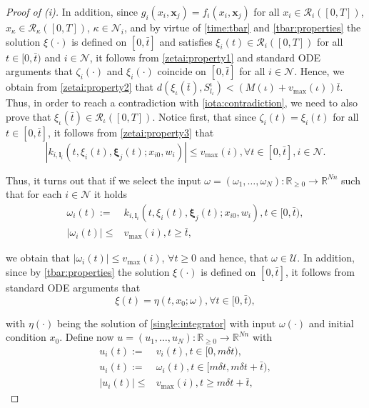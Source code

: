 \documentclass[reqno]{amsart}
\theoremstyle{plain}
\theoremstyle{definition}
\numberwithin{equation}{section}
\begin{document}
\begin{proof}[Proof of (i)]
\noindent In addition, since $g_i(x_i,{\textbf{{x}}}_j)=f_i(x_i,{\textbf{{x}}}_j)$ for all $x_i\in{\ensuremath{\mathcal{R}}}_i([0,T])$, $x_{\kappa}\in{\ensuremath{\mathcal{R}}}_{\kappa}([0,T])$, $\kappa\in{\ensuremath{\mathcal{N}}}_i$, and by virtue of \eqref{time:tbar} and \eqref{tbar:properties} the solution $\xi(\cdot)$ is defined on $[0,\bar{t}]$ and satisfies $\xi_i(t)\in{\ensuremath{\mathcal{R}}}_i([0,T])$ for all $t\in[0,\bar{t})$ and $i\in{\ensuremath{\mathcal{N}}}$, it follows from \eqref{zetai:property1} and standard ODE arguments that $\zeta_i(\cdot)$ and $\xi_i(\cdot)$ coincide on $[0,\bar{t}]$ for all $i\in{\ensuremath{\mathcal{N}}}$. Hence, we obtain from \eqref{zetai:property2} that $ d(\xi_{\iota}(\bar{t}),S_{l_{\iota}}^{\iota}) < (M(\iota)+v_{\max}(\iota))\bar{t}$. Thus, in order to reach a contradiction with \eqref{iota:contradiction}, we need to also prove that $\xi_{\iota}(\bar{t})\in{\ensuremath{\mathcal{R}}}_{\iota}([0,T])$. Notice first, that since $\zeta_i(t)=\xi_i(t)$ for all $t\in[0,\bar{t}]$, it follows from \eqref{zetai:property3} that 
\begin{equation} \label{control:laws:along:solutions}
|k_{i,{\textbf{{l}}}_i}(t,\xi_{i}(t),{\ensuremath{\boldsymbol{{\xi}}}}_j(t);x_{i0},w_i)|\le v_{\max}(i), \forall t\in[0,\bar t], i\in{\ensuremath{\mathcal{N}}}.
\end{equation}
 
\noindent Thus, it turns out that if we select the input $\omega=(\omega_1,\ldots,\omega_N):{\ensuremath{\mathbb{R}_{ \geq 0}}}\to{\ensuremath{\mathbb{R}^{{Nn}}}}$ such that for each $i\in{\ensuremath{\mathcal{N}}}$ it holds 
\begin{align*}
\omega_i(t):= & k_{i,{\textbf{{l}}}_i}(t,\xi_{i}(t),{\ensuremath{\boldsymbol{{\xi}}}}_j(t);x_{i0},w_i), t\in[0,\bar{t}), \\
|\omega_i(t)|\le & v_{\max}(i), t\ge\bar{t},
\end{align*} 

\noindent we obtain that $|\omega_i(t)|\le v_{\max}(i)$, $\forall t\ge 0$ and hence, that $\omega\in{\ensuremath{\mathcal{U}}}$. In addition, since by \eqref{tbar:properties} the solution $\xi(\cdot)$ is defined on $[0,\bar{t}]$, it follows from standard ODE arguments that 
\begin{equation} \label{xi:eq:eta}
\xi(t)=\eta(t,x_0;\omega),\forall t\in[0,\bar{t}),
\end{equation}

\noindent with $\eta(\cdot)$ being the solution of \eqref{single:integrator} with input $\omega(\cdot)$ and initial condition $x_0$. Define now $u=(u_1,\ldots,u_N):{\ensuremath{\mathbb{R}_{ \geq 0}}}\to{\ensuremath{\mathbb{R}^{{Nn}}}}$ with 
\begin{align}
u_i(t):= & v_i(t), t\in[0,m\delta t), \nonumber \\
u_i(t):= & \omega_i(t), t\in[m\delta t,m\delta t+\bar{t}), \nonumber \\
|u_i(t)|\le & v_{\max}(i), t\ge m\delta t+\bar{t}, \label{input:ui}
\end{align} 


\end{proof}
\end{document}
